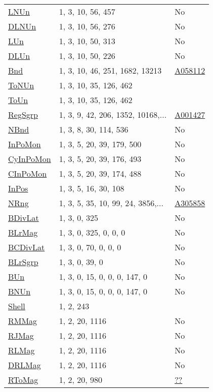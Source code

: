 {\begin{tabular}{|l|l|l|}
\hyperlink{LNUn}{LNUn}& 1, 3, 10, 56, 457 &No\\
\hyperlink{DLNUn}{DLNUn}& 1, 3, 10, 56, 276 &No\\
\hyperlink{LUn}{LUn}& 1, 3, 10, 50, 313 &No\\
\hyperlink{DLUn}{DLUn}& 1, 3, 10, 50, 226 &No\\
\hyperlink{Bnd}{Bnd}& 1, 3, 10, 46, 251, 1682, 13213 &\href{http://oeis.org/A058112}{A058112}\\
\hyperlink{ToNUn}{ToNUn}& 1, 3, 10, 35, 126, 462 &\\
\hyperlink{ToUn}{ToUn}& 1, 3, 10, 35, 126, 462 &\\
\hyperlink{RegSgrp}{RegSgrp}& 1, 3, 9, 42, 206, 1352, 10168,... &\href{http://oeis.org/A001427}{A001427}\\
\hyperlink{NBnd}{NBnd}& 1, 3, 8, 30, 114, 536 &No\\
\hyperlink{InPoMon}{InPoMon}& 1, 3, 5, 20, 39, 179, 500 &No\\
\hyperlink{CyInPoMon}{CyInPoMon}& 1, 3, 5, 20, 39, 176, 493 &No\\
\hyperlink{CInPoMon}{CInPoMon}& 1, 3, 5, 20, 39, 174, 488 &No\\
\hyperlink{InPos}{InPos}& 1, 3, 5, 16, 30, 108 &No\\
\hyperlink{NRng}{NRng}& 1, 3, 5, 35, 10, 99, 24, 3856,...&\href{http://oeis.org/A305858}{A305858}\\
\hyperlink{BDivLat}{BDivLat}& 1, 3, 0, 325 &No\\
\hyperlink{BLrMag}{BLrMag}& 1, 3, 0, 325, 0, 0, 0 &No\\
\hyperlink{BCDivLat}{BCDivLat}& 1, 3, 0, 70, 0, 0, 0 &No\\
\hyperlink{BLrSgrp}{BLrSgrp}& 1, 3, 0, 39, 0 &No\\
\hyperlink{BUn}{BUn}& 1, 3, 0, 15, 0, 0, 0, 147, 0 &No\\
\hyperlink{BNUn}{BNUn}& 1, 3, 0, 15, 0, 0, 0, 147, 0 &No\\
\hyperlink{Shell}{Shell}& 1, 2, 243 &\\
\hyperlink{RMMag}{RMMag}& 1, 2, 20, 1116 &No\\
\hyperlink{RJMag}{RJMag}& 1, 2, 20, 1116 &No\\
\hyperlink{RLMag}{RLMag}& 1, 2, 20, 1116 &No\\
\hyperlink{DRLMag}{DRLMag}& 1, 2, 20, 1116 &No\\
\hyperlink{RToMag}{RToMag}& 1, 2, 20, 980 &\href{http://oeis.org/A008793}{??}\\

\end{tabular}}
